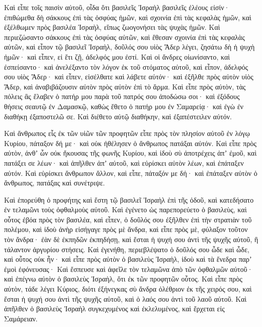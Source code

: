 {\par }{\PP {}Καὶ εἶπε τοῖς παισὶν αὐτοῦ, οἶδα ὅτι βασιλεῖς Ἰσραὴλ βασιλεῖς ἐλέους εἰσίν· ἐπιθώμεθα δὴ σάκκους ἐπὶ τὰς ὀσφύας ἡμῶν, καὶ σχοινία ἐπὶ τὰς κεφαλὰς ἡμῶν, καὶ ἐξέλθωμεν πρὸς βασιλέα Ἰσραὴλ, εἴπως ζωογονήσει τὰς ψυχὰς ἡμῶν.
Καὶ περιεζώσαντο σάκκους ἐπὶ τὰς ὀσφύας αὐτῶν, καὶ ἔθεσαν σχοινία ἐπὶ τὰς κεφαλὰς αὐτῶν, καὶ εἶπον τῷ βασιλεῖ Ἰσραὴλ, δοῦλός σου υἱὸς Ἄδερ λέγει, ζησάτω δὴ ἡ ψυχὴ ἡμῶν· καὶ εἶπεν, εἰ ἔτι ζῇ, ἀδελφός μου ἐστί.
Καὶ οἱ ἄνδρες οἰωνίσαντο, καὶ ἐσπείσαντο· καὶ ἀνελέξαντο τὸν λόγον ἐκ τοῦ στόματος αὐτοῦ, καὶ εἶπον, ἀδελφός σου υἱὸς Ἄδερ· καὶ εἶπεν, εἰσέλθατε καὶ λάβετε αὐτόν· καὶ ἐξῆλθε πρὸς αὐτὸν υἱὸς Ἄδερ, καὶ ἀναβιβάζουσιν αὐτὸν πρὸς αὐτὸν ἐπὶ τὸ ἅρμα.
Καὶ εἶπε πρὸς αὐτὸν, τὰς πόλεις ἃς ἔλαβεν ὁ πατήρ μου παρὰ τοῦ πατρός σου ἀποδώσω σοι· καὶ ἐξόδους θήσεις σεαυτῷ ἐν Δαμασκῷ, καθὼς ἔθετο ὁ πατήρ μου ἐν Σαμαρείᾳ· καὶ ἐγὼ ἐν διαθήκῃ ἐξαποστελῶ σε. Καὶ διέθετο αὐτῷ διαθήκην, καὶ ἐξαπέστειλεν αὐτόν.
\par }{\PP {}Καὶ ἄνθρωπος εἷς ἐκ τῶν υἱῶν τῶν προφητῶν εἶπε πρὸς τὸν πλησίον αὐτοῦ ἐν λόγῳ Κυρίου, πάταξον δή με· καὶ οὐκ ἠθέλησεν ὁ ἄνθρωπος πατάξαι αὐτόν.
Καὶ εἶπε πρὸς αὐτὸν, ἀνθʼ ὧν οὐκ ἤκουσας τῆς φωνῆς Κυρίου, καὶ ἰδοὺ σὺ ἀποτρέχεις ἀπʼ ἐμοῦ, καὶ πατάξει σε λέων· καὶ ἀπῆλθεν ἀπʼ αὐτοῦ, καὶ εὑρίσκει αὐτὸν λέων, καὶ ἐπάταξεν αὐτόν.
Καὶ εὑρίσκει ἄνθρωπον ἄλλον, καὶ εἶπε, πάταξόν με δή· καὶ ἐπάταξεν αὐτὸν ὁ ἄνθρωπος, πατάξας καὶ συνέτριψε.
\par }{\PP {}Καὶ ἐπορεύθη ὁ προφήτης καὶ ἔστη τῷ βασιλεῖ Ἰσραὴλ ἐπὶ τῆς ὁδοῦ, καὶ κατεδήσατο ἐν τελαμῶνι τοὺς ὀφθαλμοὺς αὐτοῦ.
Καὶ ἐγένετο ὡς παρεπορεύετο ὁ βασιλεὺς, καὶ οὗτος ἐβόα πρὸς τὸν βασιλέα, καὶ εἶπεν, ὁ δοῦλός σου ἐξῆλθεν ἐπὶ τὴν στρατιὰν τοῦ πολέμου, καὶ ἰδοὺ ἀνὴρ εἰσήγαγε πρὸς μὲ ἄνδρα, καὶ εἶπε πρὸς μὲ, φύλαξον τοῦτον τὸν ἄνδρα· ἐὰν δὲ ἐκπηδῶν ἐκπηδήσῃ, καὶ ἔσται ἡ ψυχή σου ἀντὶ τῆς ψυχῆς αὐτοῦ, ἢ τάλαντον ἀργυρίου στήσεις.
Καὶ ἐγενήθη, περιεβλέψατο ὁ δοῦλός σου ὧδε καὶ ὧδε, καὶ οὗτος οὐκ ἦν· καὶ εἶπε πρὸς αὐτὸν ὁ βασιλεὺς Ἰσραὴλ, ἰδοὺ καὶ τὰ ἔνεδρα παρʼ ἐμοὶ ἐφόνευσας·
Καὶ ἔσπευσε καὶ ἀφεῖλε τὸν τελαμῶνα ἀπὸ τῶν ὀφθαλμῶν αὐτοῦ· καὶ ἐπέγνω αὐτὸν ὁ βασιλεὺς Ἰσραὴλ, ὅτι ἐκ τῶν προφητῶν οὗτος.
Καὶ εἶπε πρὸς αὐτὸν, τάδε λέγει Κύριος, διότι ἐξήνεγκας σὺ ἄνδρα ὀλέθριον ἐκ τῆς χειρός σου, καὶ ἔσται ἡ ψυχή σου ἀντὶ τῆς ψυχῆς αὐτοῦ, καὶ ὁ λαός σου ἀντὶ τοῦ λαοῦ αὐτοῦ.
Καὶ ἀπῆλθεν ὁ βασιλεὺς Ἰσραὴλ συγκεχυμένος καὶ ἐκλελυμένος, καὶ ἔρχεται εἰς Σαμάρειαν.

}
